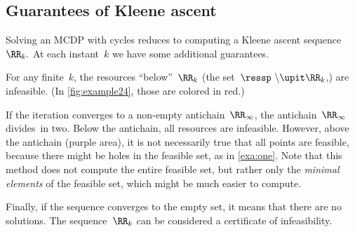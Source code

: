 \subsection{Guarantees of Kleene ascent}

\noindent Solving an MCDP with cycles reduces to computing a Kleene
ascent sequence~$\RR_{k}.$ At each instant~$k$ we have some
additional guarantees.

For any finite~$k$, the resources ``below''~$\RR_{k}$ (the
set~$\ressp\ \backslash\upit\RR_{k}$,) are infeasible. (In \cref{fig:example24},
those are colored in red.)

If the iteration converges to a non-empty antichain~$\RR_{\infty}$,
the antichain~$\RR_{\infty}$ divides~\ressp in two. Below
the antichain, all resources are infeasible. However, above the antichain
(purple area), it is not necessarily true that all points are feasible,
because there might be holes in the feasible set, as in \cref{exa:one}.
Note that this method does not compute the entire feasible set, but
rather only the \emph{minimal elements} of the feasible set, which
might be much easier to compute.

Finally, if the sequence converges to the empty set, it means that
there are no solutions. The sequence~$\RR_{k}$ can be considered
a certificate of infeasibility.
